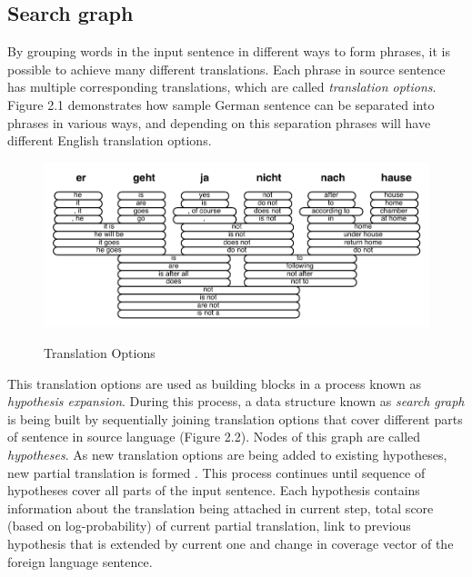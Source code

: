 \subsection{Search graph}

By grouping words in the input sentence in different ways to form phrases, it is possible to achieve many different translations. Each phrase in source sentence has multiple corresponding translations, which are called \textit{translation options}. Figure 2.1 demonstrates how sample German sentence can be separated into phrases in various ways, and depending on this separation phrases will have different English translation options. 

\begin{figure}
 \centering 
 \includegraphics{g/translation-options.pdf}
 \caption{Translation Options}
 \caption*{\textit{\cite{Koehn2009a}}}
\end{figure}

This translation options are used as building blocks in a process known as \textit{hypothesis expansion}. During this process, a data structure known as \textit{search graph} is being built by sequentially joining translation options that cover different parts of sentence in source language (Figure 2.2). Nodes of this graph are called \textit{hypotheses}. As new translation options are being added to existing hypotheses, new partial translation is formed \citep{Koehn2009a}. This process continues until sequence of hypotheses cover all parts of the input sentence. Each hypothesis contains information about the translation being attached in current step, total score (based on log-probability) of current partial translation, link to previous hypothesis that is extended by current one and change in coverage vector of the foreign language sentence.

